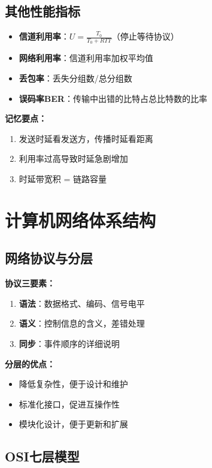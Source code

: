 \documentclass[lang=cn,newtx,10pt,scheme=chinese]{../../elegantbook}
\begin{document}
\subsection{其他性能指标}

\begin{itemize}
  \item \textbf{信道利用率}：$U = \frac{T_0}{T_0 + RTT}$（停止等待协议）
  \item \textbf{网络利用率}：信道利用率加权平均值
  \item \textbf{丢包率}：丢失分组数/总分组数
  \item \textbf{误码率BER}：传输中出错的比特占总比特数的比率
\end{itemize}

\textbf{记忆要点：}
\begin{enumerate}
  \item 发送时延看发送方，传播时延看距离
  \item 利用率过高导致时延急剧增加
  \item 时延带宽积 = 链路容量
\end{enumerate}

\section{计算机网络体系结构}

\subsection{网络协议与分层}

\textbf{协议三要素：}
\begin{enumerate}
  \item \textbf{语法}：数据格式、编码、信号电平
  \item \textbf{语义}：控制信息的含义，差错处理
  \item \textbf{同步}：事件顺序的详细说明
\end{enumerate}

\textbf{分层的优点：}
\begin{itemize}
  \item 降低复杂性，便于设计和维护
  \item 标准化接口，促进互操作性
  \item 模块化设计，便于更新和扩展
\end{itemize}

\subsection{OSI七层模型}
\end{document}

